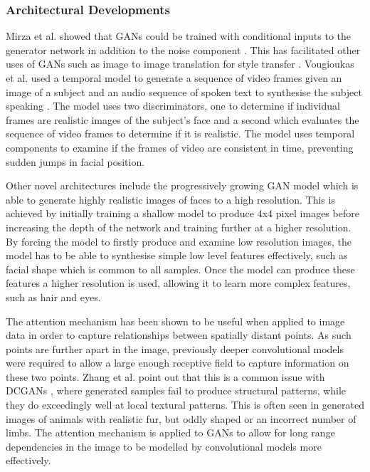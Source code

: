 \subsubsection{Architectural Developments}
Mirza et al. showed that GANs could be trained with conditional inputs to the generator network in addition to the noise component \cite{Mirza2014}.
This has facilitated other uses of GANs such as image to image translation for style transfer \cite{Zhu2017}.
Vougioukas et al. used a temporal model to generate a sequence of video frames given an image of a subject and an audio sequence of spoken text to synthesise the subject speaking \cite{Vougioukas2018}.
The model uses two discriminators, one to determine if individual frames are realistic images of the subject's face and a second which evaluates the sequence of video frames to determine if it is realistic.
The model uses temporal components to examine if the frames of video are consistent in time, preventing sudden jumps in facial position.

Other novel architectures include the progressively growing GAN model \cite{Karras2017b} which is able to generate highly realistic images of faces to a high resolution.
This is achieved by initially training a shallow model to produce 4x4 pixel images before increasing the depth of the network and training further at a higher resolution.
By forcing the model to firstly produce and examine low resolution images, the model has to be able to synthesise simple low level features effectively, such as facial shape which is common to all samples.
Once the model can produce these features a higher resolution is used, allowing it to learn more complex features, such as hair and eyes.

The attention mechanism \cite{Vaswani2017} has been shown to be useful when applied to image data \cite{Xu2015} in order to capture relationships between spatially distant points.
As such points are further apart in the image, previously deeper convolutional models were required to allow a large enough receptive field to capture information on these two points.
Zhang et al. point out that this is a common issue with DCGANs \cite{Radford2016}, where generated samples fail to produce structural patterns, while they do exceedingly well at local textural patterns.
This is often seen in generated images of animals with realistic fur, but oddly shaped or an incorrect number of limbs.
The attention mechanism is applied to GANs \cite{Zhang2018} to allow for long range dependencies in the image to be modelled by convolutional models more effectively.

